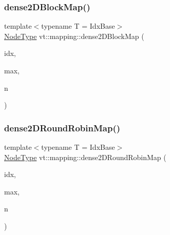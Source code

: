 \subsubsection{\texorpdfstring{dense2\+D\+Block\+Map()}{dense2DBlockMap()}}
{\footnotesize\ttfamily template$<$typename T  = Idx\+Base$>$ \\
\hyperlink{namespacevt_a866da9d0efc19c0a1ce79e9e492f47e2}{Node\+Type} vt\+::mapping\+::dense2\+D\+Block\+Map (\begin{DoxyParamCaption}\item[{\hyperlink{namespacevt_1_1mapping_a6832cbb1361fe72fd7ec730e7b7773b3}{Idx2\+D\+Ptr}$<$ T $>$}]{idx,  }\item[{\hyperlink{namespacevt_1_1mapping_a6832cbb1361fe72fd7ec730e7b7773b3}{Idx2\+D\+Ptr}$<$ T $>$}]{max,  }\item[{\hyperlink{namespacevt_a866da9d0efc19c0a1ce79e9e492f47e2}{Node\+Type}}]{n }\end{DoxyParamCaption})}

\mbox{\label{namespacevt_1_1mapping_ac606a5886c93a4dbb05dfead285c30c6}} 
\subsubsection{\texorpdfstring{dense2\+D\+Round\+Robin\+Map()}{dense2DRoundRobinMap()}}
{\footnotesize\ttfamily template$<$typename T  = Idx\+Base$>$ \\
\hyperlink{namespacevt_a866da9d0efc19c0a1ce79e9e492f47e2}{Node\+Type} vt\+::mapping\+::dense2\+D\+Round\+Robin\+Map (\begin{DoxyParamCaption}\item[{\hyperlink{namespacevt_1_1mapping_a6832cbb1361fe72fd7ec730e7b7773b3}{Idx2\+D\+Ptr}$<$ T $>$}]{idx,  }\item[{\hyperlink{namespacevt_1_1mapping_a6832cbb1361fe72fd7ec730e7b7773b3}{Idx2\+D\+Ptr}$<$ T $>$}]{max,  }\item[{\hyperlink{namespacevt_a866da9d0efc19c0a1ce79e9e492f47e2}{Node\+Type}}]{n }\end{DoxyParamCaption})}

\mbox{\label{namespacevt_1_1mapping_a91764d84e5e6d8253872740cb8424726}} 
